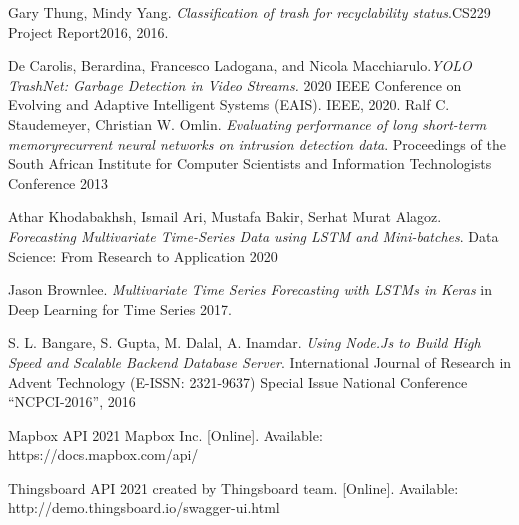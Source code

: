 \documentclass{Classes/UITBA}
\begin{document}
\begin{thebibliography}{SJL05}

 Gary Thung, Mindy Yang. \textit{Classification of trash for recyclability status}.CS229 Project Report2016, 2016.

 De Carolis, Berardina, Francesco Ladogana, and Nicola Macchiarulo.\textit{YOLO TrashNet: Garbage Detection in Video Streams.} 2020 IEEE Conference on Evolving and Adaptive Intelligent Systems (EAIS). IEEE, 2020.
 Ralf C. Staudemeyer, Christian W. Omlin. \textit{Evaluating performance of long short-term memoryrecurrent neural networks on intrusion detection data}. Proceedings of the South African Institute for Computer Scientists and Information Technologists Conference 2013

 Athar Khodabakhsh, Ismail Ari, Mustafa Bakir, Serhat Murat Alagoz. \textit{Forecasting Multivariate Time-Series Data using LSTM and Mini-batches}. Data Science: From Research to Application 2020

 Jason Brownlee. \textit{Multivariate Time Series Forecasting with LSTMs in Keras} in Deep Learning for Time Series 2017.

 S. L. Bangare, S. Gupta, M. Dalal, A. Inamdar. \textit{Using Node.Js to Build High Speed and Scalable Backend Database Server}. International Journal of Research in Advent Technology (E-ISSN: 2321-9637) Special Issue National Conference “NCPCI-2016”, 2016 

 Mapbox API 2021 Mapbox Inc. [Online]. Available: https://docs.mapbox.com/api/

 Thingsboard API 2021 created by Thingsboard team. [Online]. Available: http://demo.thingsboard.io/swagger-ui.html

\end{thebibliography}
\end{document}

